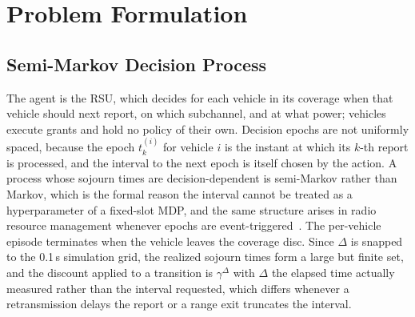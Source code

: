 \documentclass[journal]{IEEEtran}
\begin{document}
\section{Problem Formulation}
\label{sec:problem}

\subsection{Semi-Markov Decision Process}
The agent is the RSU, which decides for each vehicle in its coverage when that vehicle should next report, on which subchannel, and at what power; vehicles execute grants and hold no policy of their own. Decision epochs are not uniformly spaced, because the epoch $t_k^{(i)}$ for vehicle $i$ is the instant at which its $k$-th report is processed, and the interval to the next epoch is itself chosen by the action. A process whose sojourn times are decision-dependent is semi-Markov rather than Markov, which is the formal reason the interval cannot be treated as a hyperparameter of a fixed-slot MDP, and the same structure arises in radio resource management whenever epochs are event-triggered~\cite{perezromero2020}. The per-vehicle episode terminates when the vehicle leaves the coverage disc. Since $\Delta$ is snapped to the 0.1\,s simulation grid, the realized sojourn times form a large but finite set, and the discount applied to a transition is $\gamma^{\Delta}$ with $\Delta$ the elapsed time actually measured rather than the interval requested, which differs whenever a retransmission delays the report or a range exit truncates the interval.
\end{document}
